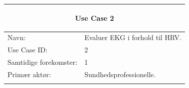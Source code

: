 \begin{table}[H] %
    \begin{tabularx}{\textwidth}{l X}
    \toprule 
    \multicolumn{2}{c}{\begin{large}\textbf{Use Case 2}\end{large}}
 \\ \midrule \addlinespace[1mm]                                                                                                                                                        
     Navn:                  &  Evaluer EKG i forhold til HRV. \\ \addlinespace[1mm]                                                                                                                                                       
     Use Case ID:           & 2                                                                                                                                                                                                                                                                                                                                                                                                                                                                                                                                                                                                                         \\ \addlinespace[1mm]                                                                                                                                                       
     Samtidige forekomster: & 1                                                                                                                                                                                                                                                                                                                                                                                                                                                                                                                                                                                                                         \\ \addlinespace[1mm]                                                                                                                                                       
     Primær aktør:          &	Sundhedsprofessionelle.                                                                                                                                                                                                                                                                                                                                                                                                                                                                                                                                                                                                                 \\ \addlinespace[1mm] 	                                                                                                                                                      

\end{tabularx}
\end{table}
